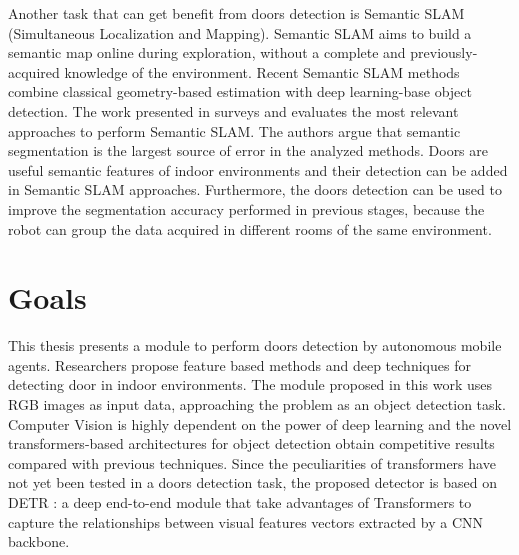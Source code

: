 Another task that can get benefit from doors detection is Semantic SLAM (Simultaneous Localization and Mapping). Semantic SLAM aims to build a semantic map online during exploration, without a complete and previously-acquired knowledge of the environment. Recent Semantic SLAM methods combine classical geometry-based estimation with deep learning-base object detection. The work presented in \cite{semanticslamsurvey} surveys and evaluates the most relevant approaches to perform Semantic SLAM. The authors argue that semantic segmentation is the largest source of error in the analyzed methods. Doors are useful semantic features of indoor environments and their detection can be added in Semantic SLAM approaches. Furthermore, the doors detection can be used to improve the segmentation accuracy performed in previous stages, because the robot can group the data acquired in different rooms of the same environment. 

\section{Goals}

This thesis presents a module to perform doors detection by autonomous mobile agents. Researchers propose feature based methods \cite{sonarandivisualdoordetection, humanoid, edgeandcornerdoorsdetector} and deep techniques \cite{detectdoorsfeature, doorsandnavigation, doorcabinet} for detecting door in indoor environments.  The module proposed in this work uses RGB images as input data, approaching the problem as an object detection task. Computer Vision is highly dependent on the power of deep learning and the novel transformers-based architectures for object detection obtain competitive results compared with previous techniques. Since the peculiarities of transformers have not yet been tested in a doors detection task, the proposed detector is based on DETR \cite{detr}: a deep end-to-end module that take advantages of Transformers to capture the relationships between visual features vectors extracted by a CNN backbone. 

